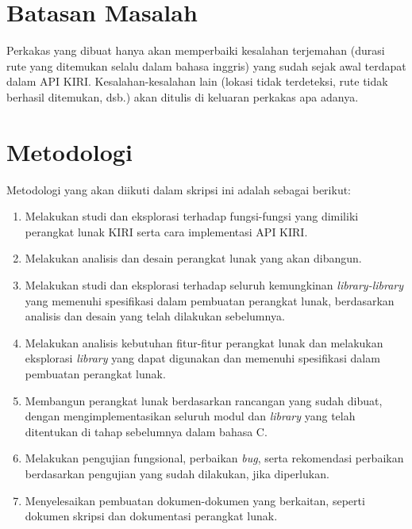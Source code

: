 \section{Batasan Masalah}
\label{sec:batasan}
Perkakas yang dibuat hanya akan memperbaiki kesalahan terjemahan (durasi rute yang ditemukan selalu dalam bahasa inggris) yang sudah sejak awal terdapat dalam API KIRI. Kesalahan-kesalahan lain (lokasi tidak terdeteksi, rute tidak berhasil ditemukan, dsb.) akan ditulis di keluaran perkakas apa adanya.

\section{Metodologi}
\label{sec:metlit}
Metodologi yang akan diikuti dalam skripsi ini adalah sebagai berikut:
	\begin{enumerate}
		\item Melakukan studi dan eksplorasi terhadap fungsi-fungsi yang dimiliki perangkat lunak KIRI serta cara implementasi API KIRI.
		\item Melakukan analisis dan desain perangkat lunak yang akan dibangun.
	    \item Melakukan studi dan eksplorasi terhadap seluruh kemungkinan \textit{library-library} yang memenuhi spesifikasi dalam pembuatan perangkat lunak, berdasarkan analisis dan desain yang telah dilakukan sebelumnya.
		\item Melakukan analisis kebutuhan fitur-fitur perangkat lunak dan melakukan eksplorasi \textit{library} yang dapat digunakan dan memenuhi spesifikasi dalam pembuatan perangkat lunak.
		\item Membangun perangkat lunak berdasarkan rancangan yang sudah dibuat, dengan mengimplementasikan seluruh modul dan \textit{library} yang telah ditentukan di tahap sebelumnya dalam bahasa C.
		\item Melakukan pengujian fungsional, perbaikan \textit{bug}, serta rekomendasi perbaikan berdasarkan pengujian yang sudah dilakukan, jika diperlukan.
		\item Menyelesaikan pembuatan dokumen-dokumen yang berkaitan, seperti dokumen skripsi dan dokumentasi perangkat lunak.
	\end{enumerate}

